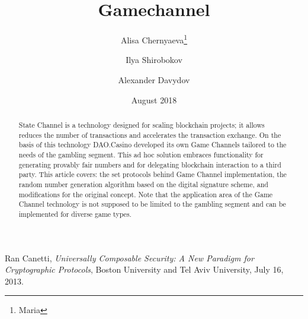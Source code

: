 \documentclass[tikz, 12pt]{article}
\title {Gamechannel}
\author {Alisa Chernyaeva\thanks{Maria}}
\author{Ilya Shirobokov\samethanks}
\author{  Alexander Davydov\samethanks}
\affil{Research department, DAO.Casino Company}
\affil{ \href{mailto:Research@Dao.casino}{Research@Dao.casino}}
\date {August 2018}
\theoremstyle{definition}
\theoremstyle{remark}
\begin{document}
\maketitle
	\begin{abstract}
State Channel is a technology designed for scaling blockchain projects; it allows reduces the number of transactions and accelerates the transaction exchange. On the basis of this technology DAO.Casino developed its own Game Channels tailored to the needs of the gambling segment. This ad hoc solution embraces functionality for generating provably fair numbers and for delegating blockchain interaction to a third party. This article covers: the set protocols behind Game Channel implementation, the random number generation algorithm based on the digital signature scheme, and modifications for the original concept. Note that the application area of the Game Channel technology is not supposed to be limited to the gambling segment and can be implemented for diverse game types.

	\end{abstract}
\tableofcontents	
	
	
		


	\begin{thebibliography}{9}
Ran Canetti, \emph{Universally Composable Security: A New Paradigm for Cryptographic Protocols}, Boston University and Tel Aviv University, July 16, 2013.
\end{thebibliography}


		
\end{document}
